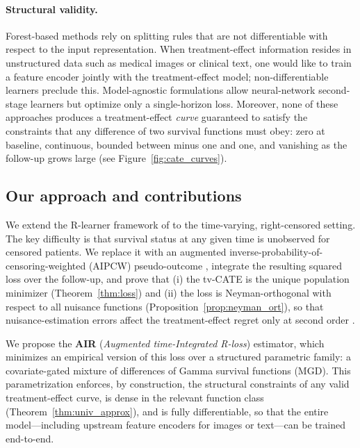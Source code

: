 \documentclass{article}
\begin{document}
\paragraph{Structural validity.}
Forest-based methods rely on splitting rules that are not differentiable with respect to the input representation.
When treatment-effect information resides in unstructured data such as medical images or clinical text, one would like to train a feature encoder jointly with the treatment-effect model; non-differentiable learners preclude this.
Model-agnostic formulations \citep{xu2024estimating,frauen2025orthogonal} allow neural-network second-stage learners but optimize only a single-horizon loss.
Moreover, none of these approaches produces a treatment-effect \emph{curve} guaranteed to satisfy the constraints that any difference of two survival functions must obey: zero at baseline, continuous, bounded between minus one and one, and vanishing as the follow-up grows large (see Figure~\ref{fig:cate_curves}).

\subsection{Our approach and contributions}\label{subsec:contributions}

We extend the R-learner framework of \citet{nie2021quasi} to the time-varying, right-censored setting.
The key difficulty is that survival status at any given time is unobserved for censored patients.
We replace it with an augmented inverse-probability-of-censoring-weighted (AIPCW) pseudo-outcome \citep{rubin2006doubly,cui2023estimating}, integrate the resulting squared loss over the follow-up, and prove that (i) the tv-CATE is the unique population minimizer (Theorem~\ref{thm:loss}) and (ii) the loss is Neyman-orthogonal with respect to all nuisance functions (Proposition~\ref{prop:neyman_ort}), so that nuisance-estimation errors affect the treatment-effect regret only at second order \citep{foster2023orthogonal}.

We propose the \textbf{AIR} (\textit{Augmented time-Integrated R-loss}) estimator, which minimizes an empirical version of this loss over a structured parametric family: a covariate-gated mixture of differences of Gamma survival functions (MGD).
This parametrization enforces, by construction, the structural constraints of any valid treatment-effect curve, is dense in the relevant function class (Theorem~\ref{thm:univ_approx}), and is fully differentiable, so that the entire model---including upstream feature encoders for images or text---can be trained end-to-end.
\end{document}
